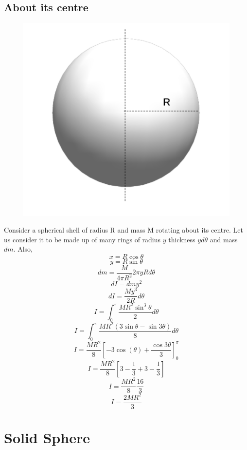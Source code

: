 \documentclass{article}
\begin{document}
\subsection{About its centre}
\begin{figure}[h!]
  \includegraphics[scale=0.3]{sphere.png}
  \centering
\end{figure}
Consider a spherical shell of radius R and mass M rotating about its centre.
Let us consider it to be made up of many rings of radius $y$ thickness $yd\theta$ and mass $dm$. Also, $$x=R\cos{\theta}$$ $$y=R\sin{\theta}$$
$$dm = \frac{M}{4\pi R^2} 2\pi y Rd\theta$$
$$dI = dmy^2$$
$$dI = \frac{My^3}{2R} d\theta$$
$$I = \int_0^{\pi} \frac{MR^2\sin^3{\theta}}{2} d\theta$$
$$I = \int_0^{\pi} \frac{MR^2\left(3\sin{\theta}-\sin{3\theta}\right)}{8} d\theta$$
$$I = \frac{MR^2}{8} \left[-3\cos(\theta) + \frac{\cos{3\theta}}{3}\right]_0^{\pi}$$
$$I = \frac{MR^2}{8}\left[3-\frac{1}{3}+3-\frac{1}{3}\right]$$
$$I = \frac{MR^2}{8}\frac{16}{3}$$
$$\boxed{I = \frac{2MR^2}{3}}$$

\section{Solid Sphere}
\end{document}
